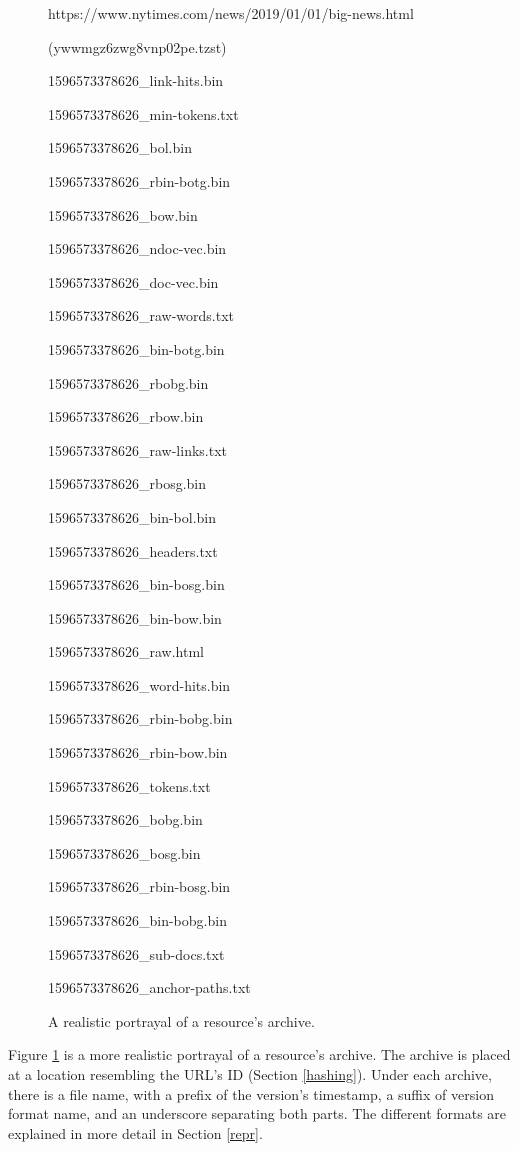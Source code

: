 \begin{figure}
\begin{nodeC}
	\item{https://www.nytimes.com/news/2019/01/01/big-news.html}
	\item{(ywwmgz6zwg8vnp02pe.tzst)}
	\begin{nodeC}
		\item{1596573378626\_link-hits.bin}
		\item{1596573378626\_min-tokens.txt}
		\item{1596573378626\_bol.bin}
		\item{1596573378626\_rbin-botg.bin}
		\item{1596573378626\_bow.bin}
		\item{1596573378626\_ndoc-vec.bin}
		\item{1596573378626\_doc-vec.bin}
		\item{1596573378626\_raw-words.txt}
		\item{1596573378626\_bin-botg.bin}
		\item{1596573378626\_rbobg.bin}
		\item{1596573378626\_rbow.bin}
		\item{1596573378626\_raw-links.txt}
		\item{1596573378626\_rbosg.bin}
		\item{1596573378626\_bin-bol.bin}
		\item{1596573378626\_headers.txt}
		\item{1596573378626\_bin-bosg.bin}
		\item{1596573378626\_bin-bow.bin}
		\item{1596573378626\_raw.html}
		\item{1596573378626\_word-hits.bin}
		\item{1596573378626\_rbin-bobg.bin}
		\item{1596573378626\_rbin-bow.bin}
		\item{1596573378626\_tokens.txt}
		\item{1596573378626\_bobg.bin}
		\item{1596573378626\_bosg.bin}
		\item{1596573378626\_rbin-bosg.bin}
		\item{1596573378626\_bin-bobg.bin}
		\item{1596573378626\_sub-docs.txt}
		\item{1596573378626\_anchor-paths.txt}
	\end{nodeC}
\end{nodeC}
\caption{A realistic portrayal of a resource's archive.}
\label{real-arc}
\end{figure}
Figure \ref{real-arc} is a more realistic portrayal of a resource's
archive.  The archive is placed at a location resembling the
URL's ID (Section \ref{hashing}).  Under each archive, there is
a file name, with a prefix of the version's timestamp,
a suffix of version format name, and an underscore separating both
parts.  The different formats are explained in more detail in
Section \ref{repr}.